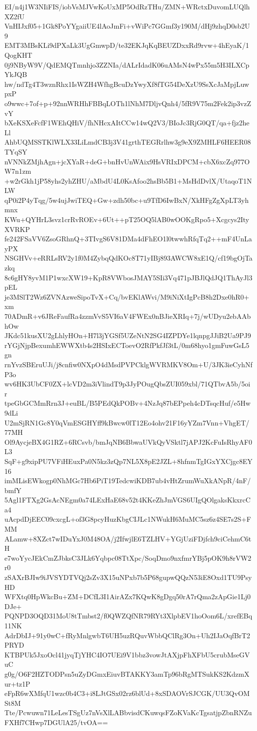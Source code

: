 EI/n4j1W3NIiFIS/iobVsMJVwKoUxMP5OdRzTHu/ZMN+WRctxDuvomLUQlhXZ2fU
VnHIJxf05+1Gk8PoYYgaiiUE4lAoJmFi+vWiPc7GGmf3y190M/dHj9zhqD0sb2U9
EMT3MBsKLi9dPXaLk3UgGmwpD/te32EKJqKqBEUZDxxRd9rvw+4hEyaK/1QogKHT
0j9NByW9V/QdEMQTmnhjo3ZZNIa/dALrIdadK06uAMsN4wPx55m5H3ILXCpYkJQB
hw/ndTg4T3wznRhx1IsWZH4WfhgBcuDzYwyXf8fTG54DeXzU9SsXcJaMpjLuwpxP
o9wwc+7of+p+92nnWRHhFBBqLOTh1lNhM7DljvQnh4/5fR9V75m2Fek2ip3vzZvY
bXeKSXeFcfF1WEhQHiV/fhNHcxAItCCw14wQ2V3/BIoJc3RjG0QT/qa+fjz2heLl
AhbUQMSSTKlWLX33LiLmdCB3j3V41grthTEGRrlhw3g9eX9ZMHLF6HEER08TYqSY
nVNNkZMjhAgn+jcXYaR+deG+bnHvUnWAix9HsVRIxDPCM+cbX6xcZq977OW7n1zm
+w2rGkh1jP58yhs2yhZHU/aMbdU4L0KsAfoo2hsBb5B1+MsHdDvlX/UtaqoT1NLW
qP0i2P4yTqg/5w4ujJwiTEQ+Gw+zdh50bc+u9TfD6IwBxN/XkHFgZgXpLT3yhmnx
KWu+QYHrL3svz1crRvROEv+6Ut++pT25OQ5lAB0wOOKgRpo5+Xcgcys2ItyXVRKP
fe242FSaVV6ZsoGRhnQ+3TIvgS6V81DMa4dFhEO1l0twwhRfqTq2++mF4UnLayPX
NSGHVv+eRRLsRV2y1f0M4ZybqQdKOc8T71yIBj893AWCW8xE1Q/cf19bgOjTazkq
8c6gHY8yvM1P1wxcXW19+KpR8VWbosJMAY5SIi3Vq471pJBJlQdJQ1ThAyJl3pEL
je3MSlT2Wz6ZVNAzweSipoTvX+Cq/bvEKlAWvi/M9iNiXtIgPcB8h2Dxe0hR0+xm
70ADmR+v6JReFaufRa4zzmVvS5VI6aV4FWEx0nBJieXRIq+7j/wUDyu2ebAAbhOw
JKdc51kusXU2gLhlyHOn+H7l3jYGSf5UZeNtN2SG4IZPDYe1lqnpgJJiB2Ua9PJ9
rYGjNjpBexumhEWWXtb4s2HSIxECToevO2RfPkfJf3tL/0m68hyo1gmFuwGsL5gn
rnYvzSBEruUJi/j8cnfiw0NXpO4dMsdPVPCklgWVRMKV8Om+U/3JK3ieCyhNfP3o
wv6HK3UbCF0ZX+lcVD2m3iVlindT9p3JyPOugQbsZUI059xbl/71QTbvA5b/5oir
tpeGbGCMmRrn3J+euBL/B5PEdQkPOBv+4NzJq87bEPpeh4cDTsqcHuf/e5Hw9dLi
U2mSjRN1Gc8Y0qVmESGHYff9kBwcw0lT12Eo4ohv21F16yYZm7Vnn+VhgET/77MH
Ol9AycjeBX4G1RZ+6RCsvb/bmJqNB6BbwaUVkQyVSktl7jAPJ2KcFuIsRhyAF0L3
SqF+g9xipPU7VFiHEuxPa0N5kz3zQp7NL5X8pE2JZL+8hfnmTgIGxYXCjgc8EY16
imMLisEWkogp0NhMGc7Hb6PiT19TedcwiKDB7ub4vHtZrumWuXkANpR/4nF/bmfY
5Agl1FTXg2GsAcNEgm0a74LExHaE68v52t4KKeZhJmVGS6UIgQOlgaksKkxrcCa4
uAcpdDjEEC09cxcgL+of3G8pcyHuzKbgCIJLc1NWukH6MuMC5sz6z4SE7s2S+FMM
ALamw+8XZct7wIDuYxJ0M48OA/j2IfwjlE6TZLHV+YGjUziFDjfch9ciCehmC6tH
e7woYycJEkCmZJbksC3JLk6Yqbpc08TtXpc/SoqDmo9nxfmrYBj5pOK9h8rVW2r0
zSAXrBJIw9iJVSYDTVQj2sZv3X15uNPxb7b5P68gupwQQzN53iE8Oxd1TU9PsyHD
WFXtq0HpWkcBu+ZM+DCfL3I1AirAZx7KQwK8gDgq50rA7rQma2zApGie1Lj0DJe+
PQNPD3OQD31MoU8tTmbst2/f0QWZQfNR79RYt3XlpbEV1hoOom6L/xrefEBq11NK
AdrDbIJ+91y0wC+fRyMnlgwbT6UH5uzRQuvWbbQClRg3On+Uh2IJaOqfBrT2PRYD
KTBPUk5JxoOcl41jyqTjYHC4IO7UEi9V1bbz3vowJtAXjpFhXFbU5crubMseGVuC
g0g/O6F2HZTODPsn5uZyDGmxEiuvBTAKKY3amTp96bRgMTSukKS2KdzmXur+tz1P
eFpR6wXMfqU1wzc0b4C3+i8LJtGSx02rz6blUd+8xSDAOVrSJCGK/UU3QvOMSt8M
Tte/Pcwuwn71LeLesTSgUz7nVsXlLABbvisdCKuwqsFZoKVaKcTgsatjpZbnRNZu
FXHf7CHwp7DGUlA25/tvOA==
